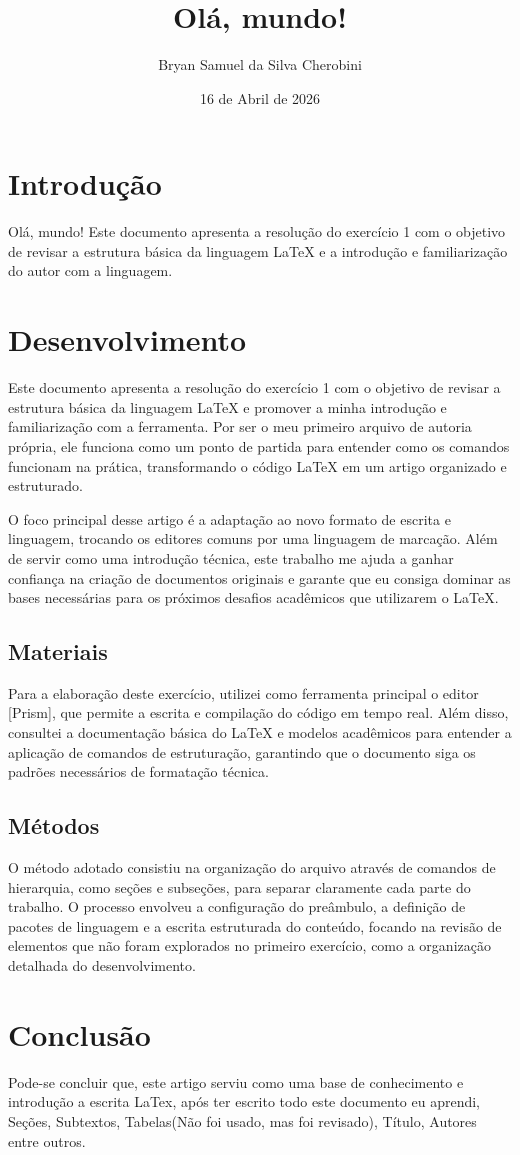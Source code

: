 \documentclass{article}
\title{Olá, mundo!}
\author{Bryan Samuel da Silva Cherobini}
\date{16 de Abril de 2026}
\begin{document}
\maketitle

\section{Introdução}


Olá, mundo!
Este documento apresenta a resolução do exercício 1 com o objetivo de revisar a estrutura básica da linguagem LaTeX e a introdução e familiarização do autor com a linguagem.

\section{Desenvolvimento}

Este documento apresenta a resolução do exercício 1 com o objetivo de revisar a estrutura básica da linguagem LaTeX e promover a minha introdução e familiarização com a ferramenta. Por ser o meu primeiro arquivo de autoria própria, ele funciona como um ponto de partida para entender como os comandos funcionam na prática, transformando o código LaTeX em um artigo organizado e estruturado.

O foco principal desse artigo é a adaptação ao novo formato de escrita e linguagem, trocando os editores comuns por uma linguagem de marcação. Além de servir como uma introdução técnica, este trabalho me ajuda a ganhar confiança na criação de documentos originais e garante que eu consiga dominar as bases necessárias para os próximos desafios acadêmicos que utilizarem o LaTeX.

    \subsection{Materiais}
    Para a elaboração deste exercício, utilizei como ferramenta principal o editor [Prism], que permite a escrita e compilação do código em tempo real. Além disso, consultei a documentação básica do LaTeX e modelos acadêmicos para entender a aplicação de comandos de estruturação, garantindo que o documento siga os padrões necessários de formatação técnica.

    \subsection{Métodos}
    O método adotado consistiu na organização do arquivo através de comandos de hierarquia, como seções e subseções, para separar claramente cada parte do trabalho. O processo envolveu a configuração do preâmbulo, a definição de pacotes de linguagem e a escrita estruturada do conteúdo, focando na revisão de elementos que não foram explorados no primeiro exercício, como a organização detalhada do desenvolvimento.

\section{Conclusão}

Pode-se concluir que, este artigo serviu como uma base de conhecimento e introdução a escrita LaTex, após ter escrito todo este documento eu aprendi, Seções, Subtextos, Tabelas(Não foi usado, mas foi revisado), Título, Autores entre outros.
\end{document}

